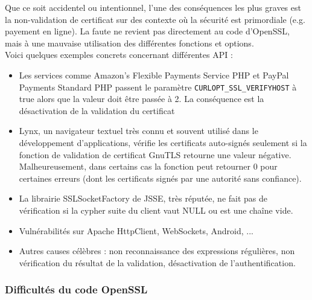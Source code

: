 			
			Que ce soit accidentel ou intentionnel, l'une des conséquences les plus graves est la non-validation de certificat sur des contexte où la sécurité est primordiale (e.g. payement en ligne). La faute ne revient pas directement au code d'OpenSSL, mais à une mauvaise utilisation des différentes fonctions et options.\\
			
			
			Voici quelques exemples concrets concernant différentes API : 
			\begin{itemize}
			\item Les services comme Amazon's Flexible Payments Service PHP et PayPal Payments Standard PHP passent le paramètre \texttt{CURLOPT\_SSL\_VERIFYHOST} à true alors que la valeur doit être passée à 2. La conséquence est la désactivation de la validation du certificat
			\item Lynx, un navigateur textuel très connu et souvent utilisé dans le développement d'applications, vérifie les certificats auto-signés seulement si la fonction de validation de certificat GnuTLS retourne une valeur négative. Malheureusement, dans certains cas la fonction peut retourner 0 pour certaines erreurs (dont les certificats signés par une autorité sans confiance).
			\item La librairie SSLSocketFactory de JSSE, très réputée, ne fait pas de vérification si la cypher suite du client vaut NULL ou est une chaîne vide.
			\item Vulnérabilités sur Apache HttpClient, WebSockets, Android, ...
			\item Autres causes célèbres : non reconnaissance des expressions régulières, non vérification du résultat de la validation, désactivation de l'authentification.\\
			\end{itemize}
			
					
		\subsubsection{Difficultés du code OpenSSL}
			

